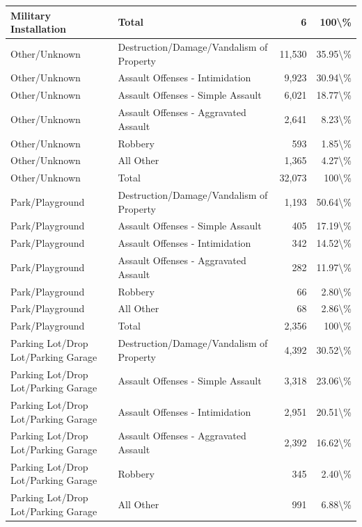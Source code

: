 \documentclass[
]{krantz}
\begin{document}
\begin{longtable}[t]{l|l|r|r}
\hline
Military Installation & Total & 6 & 100\textbackslash{}\%\\
\hline
Other/Unknown & Destruction/Damage/Vandalism of Property & 11,530 & 35.95\textbackslash{}\%\\
\hline
Other/Unknown & Assault Offenses - Intimidation & 9,923 & 30.94\textbackslash{}\%\\
\hline
Other/Unknown & Assault Offenses - Simple Assault & 6,021 & 18.77\textbackslash{}\%\\
\hline
Other/Unknown & Assault Offenses - Aggravated Assault & 2,641 & 8.23\textbackslash{}\%\\
\hline
Other/Unknown & Robbery & 593 & 1.85\textbackslash{}\%\\
\hline
Other/Unknown & All Other & 1,365 & 4.27\textbackslash{}\%\\
\hline
Other/Unknown & Total & 32,073 & 100\textbackslash{}\%\\
\hline
Park/Playground & Destruction/Damage/Vandalism of Property & 1,193 & 50.64\textbackslash{}\%\\
\hline
Park/Playground & Assault Offenses - Simple Assault & 405 & 17.19\textbackslash{}\%\\
\hline
Park/Playground & Assault Offenses - Intimidation & 342 & 14.52\textbackslash{}\%\\
\hline
Park/Playground & Assault Offenses - Aggravated Assault & 282 & 11.97\textbackslash{}\%\\
\hline
Park/Playground & Robbery & 66 & 2.80\textbackslash{}\%\\
\hline
Park/Playground & All Other & 68 & 2.86\textbackslash{}\%\\
\hline
Park/Playground & Total & 2,356 & 100\textbackslash{}\%\\
\hline
Parking Lot/Drop Lot/Parking Garage & Destruction/Damage/Vandalism of Property & 4,392 & 30.52\textbackslash{}\%\\
\hline
Parking Lot/Drop Lot/Parking Garage & Assault Offenses - Simple Assault & 3,318 & 23.06\textbackslash{}\%\\
\hline
Parking Lot/Drop Lot/Parking Garage & Assault Offenses - Intimidation & 2,951 & 20.51\textbackslash{}\%\\
\hline
Parking Lot/Drop Lot/Parking Garage & Assault Offenses - Aggravated Assault & 2,392 & 16.62\textbackslash{}\%\\
\hline
Parking Lot/Drop Lot/Parking Garage & Robbery & 345 & 2.40\textbackslash{}\%\\
\hline
Parking Lot/Drop Lot/Parking Garage & All Other & 991 & 6.88\textbackslash{}\%\\

\end{longtable}
\end{document}
